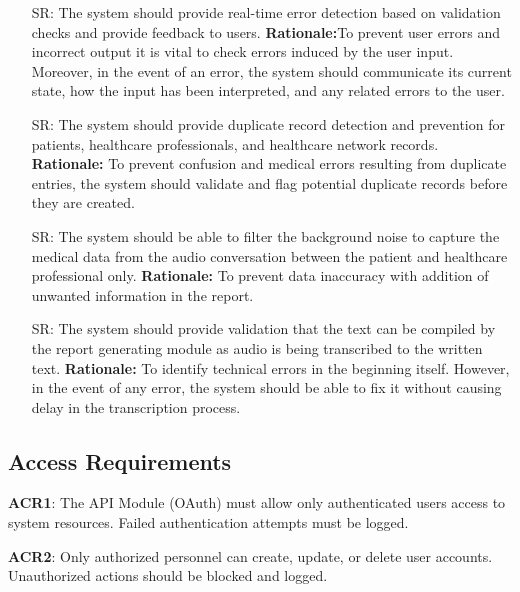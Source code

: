 \documentclass{article}
\newcounter{srnum} %
\begin{document}
\begin{itemize}
    \item[SR\refstepcounter{srnum}\thesrnum \label{SR_ErrorDetection}:] The system should provide real-time error detection based on validation checks and provide feedback to users.
    \textbf{Rationale:}To prevent user errors and incorrect output it is vital to check errors induced by the user input. Moreover, in the event of an error, the system should communicate its current state, how the input has been interpreted, and any related errors to the user.
    
    \item [SR\refstepcounter{srnum}\thesrnum \label{SR_DuplicateRecordDetection}:] The system should provide duplicate record detection and prevention for patients, healthcare professionals, and healthcare network records.
    \textbf{Rationale:} To prevent confusion and medical errors resulting from duplicate entries, the system should validate and flag potential duplicate records before they are created.

    \item [SR\refstepcounter{srnum}\thesrnum \label{SR_BackNoiseFilter}:] The system should be able to filter the background noise to capture the medical data from the audio conversation between the patient and healthcare professional only.
    \textbf{Rationale:} To prevent data inaccuracy with addition of unwanted information in the report.

    \item [SR\refstepcounter{srnum}\thesrnum \label{SR_CompilingVerification}:] The system should provide validation that the text can be compiled by the report generating module as audio is being transcribed to the written text.
    \textbf{Rationale:} To identify technical errors in the beginning itself. However, in the event of any error, the system should be able to fix it without causing delay in the transcription process. 
\end{itemize}

\subsection{Access Requirements}
\textbf{ACR1}: The API Module (OAuth) must allow only authenticated users access to system resources. Failed authentication attempts must be logged.

\noindent \textbf{ACR2}: Only authorized personnel can create, update, or delete user accounts. Unauthorized actions should be blocked and logged.
\end{document}
